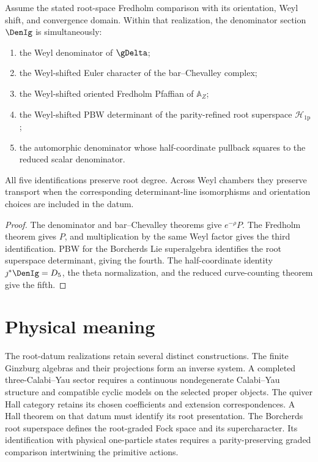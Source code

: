 \begin{theorem}
Assume the stated root-space Fredholm comparison with its orientation,
Weyl shift, and convergence domain.
Within that realization, the denominator section $\DenIg$ is simultaneously:
\begin{enumerate}
\item the Weyl denominator of $\gDelta$;
\item the Weyl-shifted Euler character of the bar--Chevalley complex;
\item the Weyl-shifted oriented Fredholm Pfaffian of $\mathbb A_Z$;
\item the Weyl-shifted PBW determinant of the parity-refined root superspace $\mathcal H_{\mathrm{1p}}$;
\item the automorphic denominator whose half-coordinate pullback squares to the reduced scalar denominator.
\end{enumerate}
All five identifications preserve root degree. Across Weyl chambers
they preserve transport when the corresponding determinant-line
isomorphisms and orientation choices are included in the datum.
\end{theorem}
\begin{proof}
The denominator and bar--Chevalley theorems give $e^{-\rho}P$.
The Fredholm theorem gives $P$, and multiplication by the same Weyl
factor gives the third identification.  PBW for the Borcherds Lie superalgebra identifies the root superspace determinant, giving the fourth.  The half-coordinate identity $\jmath^*\DenIg=D_5$, the theta normalization, and the reduced curve-counting theorem give the fifth.
\end{proof}

\section{Physical meaning}
The root-datum realizations retain several distinct constructions.
The finite Ginzburg algebras and their projections form an inverse system.
A completed three-Calabi--Yau sector requires a continuous nondegenerate
Calabi--Yau structure and compatible cyclic models on the selected proper objects.
The quiver Hall category retains its chosen coefficients and extension
correspondences. A Hall theorem on that datum must identify its root presentation.
The Borcherds root superspace defines the root-graded Fock space and its
supercharacter. Its identification with physical one-particle states
requires a parity-preserving graded comparison intertwining the primitive actions.

